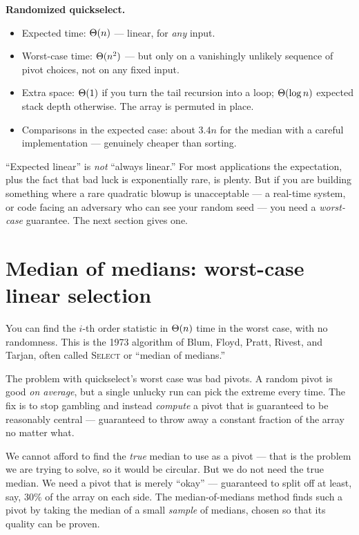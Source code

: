 \begin{complexitybox}
\textbf{Randomized quickselect.}
\begin{itemize}
  \item Expected time: $\Theta(n)$ --- linear, for \emph{any} input.
  \item Worst-case time: $\Theta(n^2)$ --- but only on a vanishingly unlikely sequence
    of pivot choices, not on any fixed input.
  \item Extra space: $\Theta(1)$ if you turn the tail recursion into a loop;
    $\Theta(\log n)$ expected stack depth otherwise. The array is permuted in place.
  \item Comparisons in the expected case: about $3.4n$ for the median with a careful
    implementation --- genuinely cheaper than sorting.
\end{itemize}
\end{complexitybox}

\begin{trapbox}
``Expected linear'' is \emph{not} ``always linear.'' For most applications the
expectation, plus the fact that bad luck is exponentially rare, is plenty. But if
you are building something where a rare quadratic blowup is unacceptable --- a
real-time system, or code facing an adversary who can see your random seed --- you
need a \emph{worst-case} guarantee. The next section gives
one.
\end{trapbox}

\section{Median of medians: worst-case linear selection}

You can find the $i$-th order statistic in $\Theta(n)$ time in the worst case, with no randomness. This is the 1973 algorithm of Blum, Floyd, Pratt, Rivest, and Tarjan, often
called \textsc{Select} or ``median of medians.''

The problem with quickselect's worst case was bad pivots. A random pivot is good
\emph{on average}, but a single unlucky run can pick the extreme every time. The
fix is to stop gambling and instead \emph{compute} a pivot that is guaranteed to be
reasonably central --- guaranteed to throw away a constant fraction of the array no
matter what. 

\begin{intuitionbox}
We cannot afford to find the \emph{true} median to use as a pivot --- that is the
problem we are trying to solve, so it would be circular. But we do not need the
true median. We need a pivot that is merely ``okay'' --- guaranteed to split off at
least, say, $30\%$ of the array on each side. The median-of-medians method
finds such a pivot by taking the median of a small \emph{sample} of
medians, chosen so that its quality can be proven.
\end{intuitionbox}

